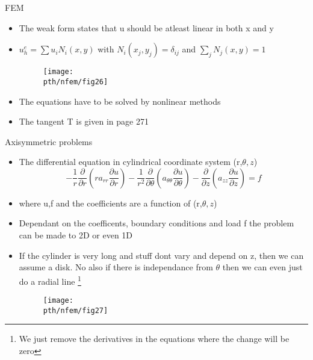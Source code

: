 	\begin{frame}{FEM}
		\begin{itemize}
			\item The weak form states that u should be atleast linear in both x and y
			\item $u_h^e = \sum u_iN_i(x,y)$ with $N_i(x_j,y_j) = \delta_{ij} $ and $\sum_j N_j(x,y)=1$
			\begin{figure}
				\centering
				\texttt{[image: \\pth/nfem/fig26]} 		
			\end{figure}	
		\end{itemize}
	\end{frame}


	\begin{frame}
		\begin{itemize}
			\item The equations have to be solved by nonlinear methods
			\item The tangent T is given in page 271
		\end{itemize}
	\end{frame}


	\begin{frame}{Axisymmetric problems}
		\begin{itemize}
			\item The differential equation in cylindrical coordinate system (r,$\theta,z$)
			\begin{equation}
				-\frac{1}{r}\frac{\partial}{\partial r}\left(ra_{rr}\frac{\partial u}{\partial r} \right)
				- \frac{1}{r^2}\frac{\partial}{\partial \theta}\left(a_{\theta\theta}\frac{\partial u}{\partial \theta} \right)
				- \frac{\partial}{\partial z}\left(a_{zz}\frac{\partial u}{\partial z} \right) = f
			\end{equation} 
			\item where u,f and the coefficients are a function of (r,$\theta,z$)
			\item Dependant on the coefficents, boundary conditions and load f the problem can be made to 2D or even 1D
			\item If the cylinder is very long and stuff dont vary and depend on z, then we can assume a disk. No also if there is independance from $\theta$ then we can even just do a radial line \footnote{We just remove the derivatives in the equations where the change will be zero}
			\begin{figure}
				\centering
				\texttt{[image: \\pth/nfem/fig27]} 		
			\end{figure}
		\end{itemize}
	\end{frame}


